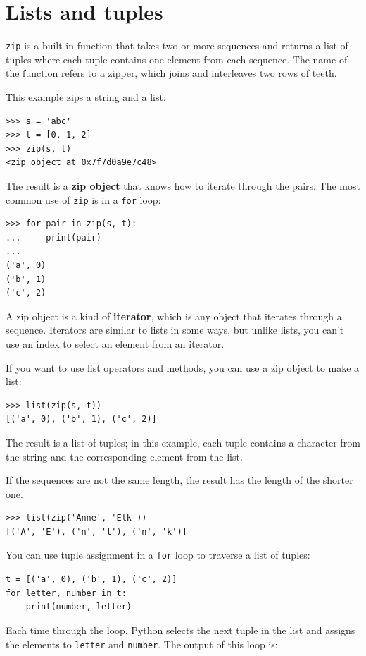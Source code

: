 \documentclass[10pt]{book}
\begin{document}
\section{Lists and tuples}

{\tt zip} is a built-in function that takes two or more sequences and
returns a list of tuples where each tuple contains one
element from each sequence.  The name of the function refers to
a zipper, which joins and interleaves two rows of teeth.

This example zips a string and a list:

\begin{verbatim}
>>> s = 'abc'
>>> t = [0, 1, 2]
>>> zip(s, t)
<zip object at 0x7f7d0a9e7c48>
\end{verbatim}
%
The result is a {\bf zip object} that knows how to iterate through
the pairs.  The most common use of {\tt zip} is in a {\tt for} loop:

\begin{verbatim}
>>> for pair in zip(s, t):
...     print(pair)
...
('a', 0)
('b', 1)
('c', 2)
\end{verbatim}
%
A zip object is a kind of {\bf iterator}, which is any object
that iterates through a sequence.  Iterators are similar to lists in some
ways, but unlike lists, you can't use an index to select an element from
an iterator.

If you want to use list operators and methods, you can
use a zip object to make a list:

\begin{verbatim}
>>> list(zip(s, t))
[('a', 0), ('b', 1), ('c', 2)]
\end{verbatim}
%
The result is a list of tuples; in this example, each tuple contains
a character from the string and the corresponding element from
the list.

If the sequences are not the same length, the result has the
length of the shorter one.

\begin{verbatim}
>>> list(zip('Anne', 'Elk'))
[('A', 'E'), ('n', 'l'), ('n', 'k')]
\end{verbatim}
%
You can use tuple assignment in a {\tt for} loop to traverse a list of
tuples:

\begin{verbatim}
t = [('a', 0), ('b', 1), ('c', 2)]
for letter, number in t:
    print(number, letter)
\end{verbatim}
%
Each time through the loop, Python selects the next tuple in
the list and assigns the elements to {\tt letter} and 
{\tt number}.  The output of this loop is:
\end{document}
